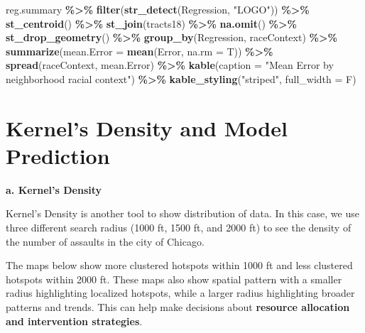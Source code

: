 \documentclass[
]{article}
\newenvironment{Shaded}{\begin{snugshade}}{\end{snugshade}}
\newcommand{\AttributeTok}[1]{\textcolor[rgb]{0.13,0.29,0.53}{#1}}
\newcommand{\FunctionTok}[1]{\textcolor[rgb]{0.13,0.29,0.53}{\textbf{#1}}}
\newcommand{\NormalTok}[1]{#1}
\newcommand{\SpecialCharTok}[1]{\textcolor[rgb]{0.81,0.36,0.00}{\textbf{#1}}}
\newcommand{\StringTok}[1]{\textcolor[rgb]{0.31,0.60,0.02}{#1}}
\begin{document}
\begin{Shaded}
\begin{Highlighting}[]
\NormalTok{reg.summary }\SpecialCharTok{\%\textgreater{}\%} 
  \FunctionTok{filter}\NormalTok{(}\FunctionTok{str\_detect}\NormalTok{(Regression, }\StringTok{"LOGO"}\NormalTok{)) }\SpecialCharTok{\%\textgreater{}\%}
    \FunctionTok{st\_centroid}\NormalTok{() }\SpecialCharTok{\%\textgreater{}\%}
    \FunctionTok{st\_join}\NormalTok{(tracts18) }\SpecialCharTok{\%\textgreater{}\%}
    \FunctionTok{na.omit}\NormalTok{() }\SpecialCharTok{\%\textgreater{}\%}
      \FunctionTok{st\_drop\_geometry}\NormalTok{() }\SpecialCharTok{\%\textgreater{}\%}
      \FunctionTok{group\_by}\NormalTok{(Regression, raceContext) }\SpecialCharTok{\%\textgreater{}\%}
      \FunctionTok{summarize}\NormalTok{(}\AttributeTok{mean.Error =} \FunctionTok{mean}\NormalTok{(Error, }\AttributeTok{na.rm =}\NormalTok{ T)) }\SpecialCharTok{\%\textgreater{}\%}
      \FunctionTok{spread}\NormalTok{(raceContext, mean.Error) }\SpecialCharTok{\%\textgreater{}\%}
      \FunctionTok{kable}\NormalTok{(}\AttributeTok{caption =} \StringTok{"Mean Error by neighborhood racial context"}\NormalTok{) }\SpecialCharTok{\%\textgreater{}\%}
        \FunctionTok{kable\_styling}\NormalTok{(}\StringTok{"striped"}\NormalTok{, }\AttributeTok{full\_width =}\NormalTok{ F) }
\end{Highlighting}
\end{Shaded}

\section{Kernel's Density and Model
Prediction}\label{kernels-density-and-model-prediction}

\textbf{a. Kernel's Density}

Kernel's Density is another tool to show distribution of data. In this
case, we use three different search radius (1000 ft, 1500 ft, and 2000
ft) to see the density of the number of assaults in the city of Chicago.

The maps below show more clustered hotspots within 1000 ft and less
clustered hotspots within 2000 ft. These maps also show spatial pattern
with a smaller radius highlighting localized hotspots, while a larger
radius highlighting broader patterns and trends. This can help make
decisions about \textbf{resource allocation and intervention
strategies}.
\end{document}
